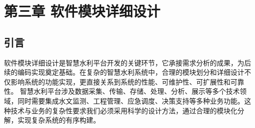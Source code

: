 \section{第三章 软件模块详细设计}\label{ux7b2cux4e09ux7ae0-ux8f6fux4ef6ux6a21ux5757ux8be6ux7ec6ux8bbeux8ba1} \learningobjectives{
}\subsection{引言}\label{ux5f15ux8a00}
软件模块详细设计是智慧水利平台开发的关键环节，它承接需求分析的成果，为后续的编码实现奠定基础。在复杂的智慧水利系统中，合理的模块划分和详细设计不仅影响系统的功能实现，更直接关系到系统的性能、可维护性、可扩展性和可靠性。
智慧水利平台涉及数据采集、传输、存储、处理、分析、展示等多个技术领域，同时需要集成水文监测、工程管理、应急调度、决策支持等多种业务功能。这种技术与业务的复杂性要求我们必须采用科学的设计方法，通过合理的模块化分解，实现复杂系统的有序构建。
